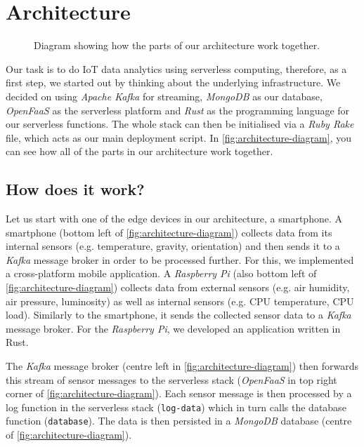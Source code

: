 \chapter{Architecture}
\label{sec:architecture}

\begin{figure}[H]
  \caption{Diagram showing how the parts of our architecture work together.
    \nocite{smartphone-icon, browser-icon}
  }
  \label{fig:architecture-diagram}
\end{figure}

Our task is to do IoT data analytics using serverless computing, therefore, as a first step, we
started out by thinking about the underlying infrastructure. We decided on using \textit{Apache
Kafka} for streaming, \textit{MongoDB} as our database, \textit{OpenFaaS} as the serverless platform
and \textit{Rust} as the programming language for our serverless functions. The whole stack can then
be initialised via a \textit{Ruby Rake} file, which acts as our main deployment script. In
\autoref{fig:architecture-diagram}, you can see how all of the parts in our architecture work
together.

\section{How does it work?}

Let us start with one of the edge devices in our architecture, a smartphone. A smartphone (bottom
left of \autoref{fig:architecture-diagram}) collects data from its internal sensors (e.g.
temperature, gravity, orientation) and then sends it to a \textit{Kafka} message broker in order to
be processed further. For this, we implemented a cross-platform mobile application. A
\textit{Raspberry Pi} (also bottom left of \autoref{fig:architecture-diagram}) collects data from
external sensors (e.g. air humidity, air pressure, luminosity) as well as internal sensors (e.g. CPU
temperature, CPU load). Similarly to the smartphone, it sends the collected sensor data to a
\textit{Kafka} message broker. For the \textit{Raspberry Pi}, we developed an application written in
Rust.

The \textit{Kafka} message broker (centre left in \autoref{fig:architecture-diagram}) then forwards
this stream of sensor messages to the serverless stack (\textit{OpenFaaS} in top right corner of
\autoref{fig:architecture-diagram}). Each sensor message is then processed by a log function in the
serverless stack (\texttt{log-data}) which in turn calls the database function (\texttt{database}).
The data is then persisted in a \textit{MongoDB} database (centre of
\autoref{fig:architecture-diagram}).

